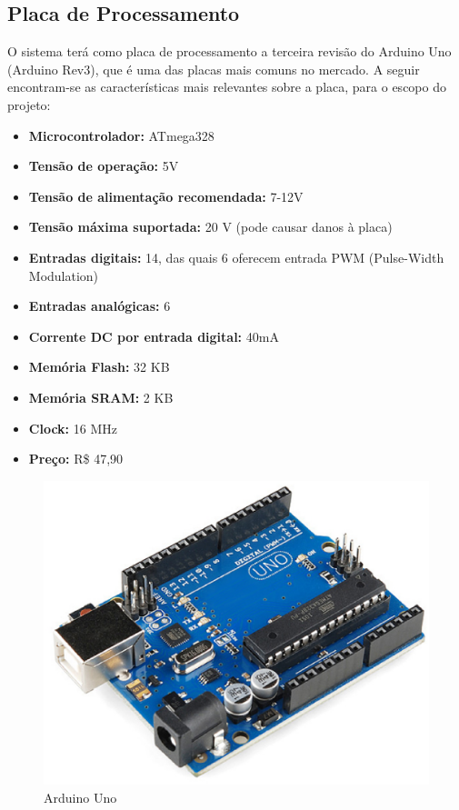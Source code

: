\subsection{Placa de Processamento}
O sistema terá como placa de processamento a terceira revisão do Arduino Uno (Arduino Rev3), que é uma das placas mais comuns no mercado. A seguir encontram-se as características mais relevantes sobre a placa, para o escopo do projeto:
\begin{itemize}
	\item \textbf{Microcontrolador:} ATmega328
	\item \textbf{Tensão de operação:} 5V
	\item \textbf{Tensão de alimentação recomendada:} 7-12V
	\item \textbf{Tensão máxima suportada:} 20 V (pode causar danos à placa)
	\item \textbf{Entradas digitais:} 14, das quais 6 oferecem entrada PWM (Pulse-Width Modulation)
	\item \textbf{Entradas analógicas:} 6
	\item \textbf{Corrente DC por entrada digital:} 40mA
	\item \textbf{Memória Flash:} 32 KB
	\item \textbf{Memória SRAM:} 2 KB
	\item \textbf{Clock:} 16 MHz
	\item \textbf{Preço:} R\$ 47,90
	
\end{itemize}
\begin{figure}[!htb]                   
	\centering                          
	\includegraphics[scale=0.3]{figuras/Figura_9.eps}
	\caption{Arduino Uno}               
\end{figure}
